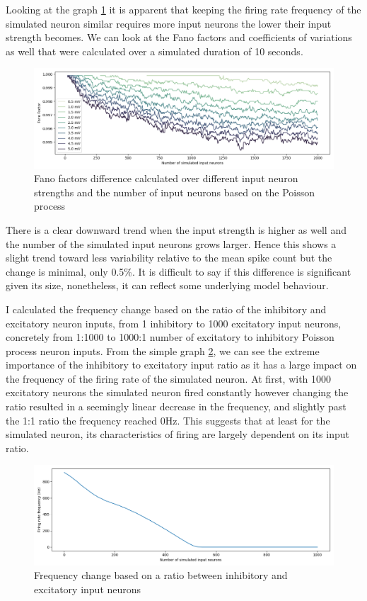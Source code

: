 \documentclass[11pt]{article}
\begin{document}
Looking at the graph \ref{fig:q3_graph2} it is apparent that keeping the firing rate frequency of the simulated neuron similar requires more input neurons the lower their input strength becomes. We can look at the Fano factors and coefficients of variations as well that were calculated over a simulated duration of 10 seconds.

\begin{figure}[ht]
    \includegraphics[width=1\linewidth]{Figure_FanoFactors.png}
    \caption{Fano factors difference calculated over different input neuron strengths and the number of input neurons based on the Poisson process}
    \label{fig:q3_graph2}
\end{figure}
There is a clear downward trend when the input strength is higher as well and the number of the simulated input neurons grows larger. Hence this shows a slight trend toward less variability relative to the mean spike count but the change is minimal, only 0.5\%. It is difficult to say if this difference is significant given its size, nonetheless, it can reflect some underlying model behaviour. 

I calculated the frequency change based on the ratio of the inhibitory and excitatory neuron inputs, from 1 inhibitory to 1000 excitatory input neurons, concretely from 1:1000 to 1000:1 number of excitatory to inhibitory Poisson process neuron inputs. From the simple graph \ref{fig:q3_graph3}, we can see the extreme importance of the inhibitory to excitatory input ratio as it has a large impact on the frequency of the firing rate of the simulated neuron. At first, with 1000 excitatory neurons the simulated neuron fired constantly however changing the ratio resulted in a seemingly linear decrease in the frequency, and slightly past the 1:1 ratio the frequency reached 0Hz. This suggests that at least for the simulated neuron, its characteristics of firing are largely dependent on its input ratio.

\begin{figure}[H]
    \centering
    \includegraphics[width=0.83\linewidth]{Figure_ratio.png}
    \captionsetup{font=small}
    \caption{Frequency change based on a ratio between inhibitory and excitatory input neurons}
    \label{fig:q3_graph3}
\end{figure}
\end{document}
